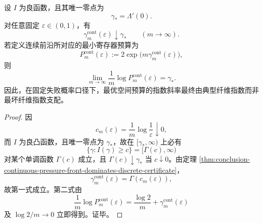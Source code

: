 \begin{corollary}[固定置信度下连续证书指数向典型纤维指数收敛]\label{cor:conclusion-fixed-confidence-continuous-certificate-typical-fiber-limit}
设 \(I\) 为良函数，且其唯一零点为
\[
\gamma_{\ast}=\Lambda'(0).
\]
对任意固定 \(\varepsilon\in(0,1)\)，有
\[
\gamma_m^{\mathrm{cont}}(\varepsilon)\downarrow \gamma_{\ast}
\qquad (m\to\infty).
\]
若定义连续前沿所对应的最小寄存器预算为
\[
P_m^{\mathrm{cont}}(\varepsilon):=
2\exp\bigl(m\gamma_m^{\mathrm{cont}}(\varepsilon)\bigr),
\]
则
\[
\lim_{m\to\infty}\frac1m\log P_m^{\mathrm{cont}}(\varepsilon)=\gamma_{\ast}.
\]
因此，在固定失败概率口径下，最优空间预算的指数斜率最终由典型纤维指数而非最坏纤维指数支配。
\end{corollary}
\begin{proof}
因
\[
c_m(\varepsilon)=\frac1m\log\frac1\varepsilon\downarrow 0,
\]
而 \(I\) 为良凸函数，且唯一零点为 \(\gamma_{\ast}\)，故在 \([\gamma_{\ast},\infty)\) 上必有
\[
\{\gamma:I(\gamma)\ge c\}=[\Gamma(c),\infty)
\]
对某个单调函数 \(\Gamma(c)\) 成立，且 \(\Gamma(c)\downarrow \gamma_{\ast}\) 当 \(c\downarrow 0\)。由定理 \ref{thm:conclusion-continuous-pressure-front-dominates-discrete-certificate}，
\[
\gamma_m^{\mathrm{cont}}(\varepsilon)=\Gamma(c_m(\varepsilon)),
\]
故第一式成立。第二式由
\[
\frac1m\log P_m^{\mathrm{cont}}(\varepsilon)
=
\frac{\log 2}{m}+\gamma_m^{\mathrm{cont}}(\varepsilon)
\]
及 \(\log 2/m\to 0\) 立即得到。证毕。
\end{proof}

